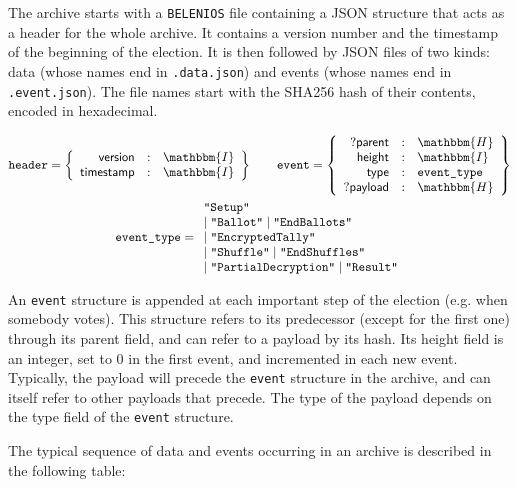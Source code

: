 \documentclass[a4paper]{article}
\newcommand{\hash}{\mathbbm{H}}
\newcommand{\I}{\mathbbm{I}}
\begin{document}
The archive starts with a \texttt{BELENIOS} file containing a JSON
structure that acts as a header for the whole archive. It contains a
version number and the timestamp of the beginning of the election.  It
is then followed by JSON files of two kinds: data (whose names end in
\texttt{.data.json}) and events (whose names end in
\texttt{.event.json}). The file names start with the SHA256 hash of
their contents, encoded in hexadecimal.

\begin{gather*}
  \texttt{header}=\left\{
    \begin{array}{rcl}
      \textsf{version}&:&\I\\
      \textsf{timestamp}&:&\I
    \end{array}
  \right\}
  \qquad
  \texttt{event}=\left\{
    \begin{array}{rcl}
      ?\textsf{parent}&:&\hash\\
      \textsf{height}&:&\I\\
      \textsf{type}&:&\texttt{event\_type}\\
      ?\textsf{payload}&:&\hash
    \end{array}
  \right\}\\
  \texttt{event\_type}=
  \begin{array}{l}
    \texttt{"Setup"}\\
    \mid\texttt{"Ballot"}
    \mid\texttt{"EndBallots"}\\
    \mid\texttt{"EncryptedTally"}\\
    \mid\texttt{"Shuffle"}
    \mid\texttt{"EndShuffles"}\\
    \mid\texttt{"PartialDecryption"}
    \mid\texttt{"Result"}
  \end{array}
\end{gather*}

An \texttt{event} structure is appended at each important step of the
election (e.g. when somebody votes). This structure refers to its
predecessor (except for the first one) through its \textsf{parent}
field, and can refer to a payload by its hash. Its \textsf{height}
field is an integer, set to 0 in the first event, and incremented in
each new event. Typically, the payload will precede the \texttt{event}
structure in the archive, and can itself refer to other payloads that
precede. The type of the payload depends on the \textsf{type} field of
the \texttt{event} structure.

The typical sequence of data and events occurring in an archive is
described in the following table:
\end{document}
